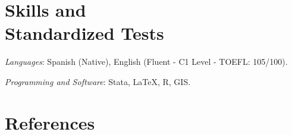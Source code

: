 \documentclass[margin,line]{res}
\begin{document}
\begin{resume}
\section{\sc Skills  and \\ Standardized Tests}

\textit{Languages}: Spanish (Native), English (Fluent - C1 Level - TOEFL: 105/100).

\vspace{-.2cm}


\vspace{-.2cm}

\textit{Programming and Software}: Stata, {\LaTeX}, \textsc{R}, \textsc{GIS}. 




\section{\sc References}


\end{resume}
\end{document}
